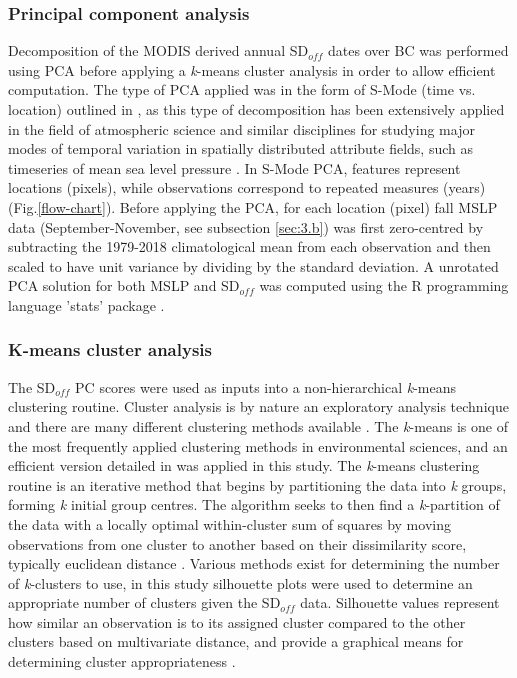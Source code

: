 \documentclass{tATO2e}
\newcommand{\sdoff}{SD$_{off}$}
\begin{document}
\subsubsection{Principal component analysis}\label{sdoffpca}
Decomposition of the MODIS derived annual \sdoff{} dates over BC was performed using PCA before applying a \textit{k}-means cluster analysis in order to allow efficient computation. The type of PCA applied was in the form of S-Mode (time vs. location) outlined in \cite{Richman1986}, as this type of decomposition has been extensively applied in the field of atmospheric science and similar disciplines for studying major modes of temporal variation in spatially distributed attribute fields, such as timeseries of mean sea level pressure \citep{Urska2013}. In S-Mode PCA, features represent locations (pixels), while observations correspond to repeated measures (years) (Fig.\ref{flow-chart}). Before applying the PCA, for each location (pixel) fall MSLP data (September-November, see
subsection \ref{sec:3.b}) was first zero-centred by subtracting the 1979-2018 climatological mean from each
observation and then scaled to have unit variance by dividing by the standard deviation. A unrotated PCA solution for both MSLP and \sdoff{} was computed using the R programming language 'stats' package \citep{r_stats}.

\subsubsection{K-means cluster analysis}
The \sdoff{} PC scores were used as inputs into a non-hierarchical \textit{k}-means clustering routine. Cluster analysis is by nature an exploratory analysis technique and there are many different clustering methods available \citep{Gotelli2013}. The \textit{k}-means is one of the most frequently applied clustering methods in environmental sciences, and an efficient version detailed in \cite{Hartigan1979} was applied in this study. The \textit{k}-means clustering routine is an iterative method that begins by partitioning the data into \textit{k} groups, forming \textit{k} initial group centres. The algorithm seeks to then find a \textit{k}-partition of the data with a locally optimal within-cluster sum of squares by moving observations from one cluster to another based on their dissimilarity score, typically euclidean distance \citep{Hartigan1979}. Various methods exist for determining the number of \textit{k}-clusters to use, in this study silhouette plots were used to determine an appropriate number of clusters given the \sdoff{} data. Silhouette values represent how similar an observation is to its assigned cluster compared to the other clusters based on multivariate distance, and provide a graphical means for determining cluster appropriateness \citep{Rousseeuw1987}.
\end{document}
